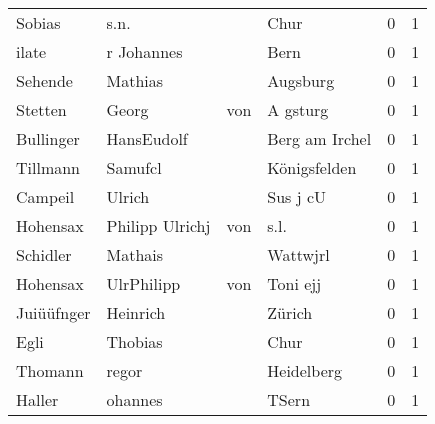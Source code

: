 \documentclass[10pt,a4paper,landscape]{article}
\begin{document}
\begin{longtable}{llllrr}
                   Sobias &                               s.n. &             &                                        Chur &          0 &         1 \\
                    ilate &                         r Johannes &             &                                        Bern &          0 &         1 \\
                  Sehende &                            Mathias &             &                                    Augsburg &          0 &         1 \\
                  Stetten &                              Georg &         von &                                    A gsturg &          0 &         1 \\
                Bullinger &                         HansEudolf &             &                              Berg am Irchel &          0 &         1 \\
                 Tillmann &                            Samufcl &             &                                Königsfelden &          0 &         1 \\
                  Campeil &                             Ulrich &             &                                    Sus j cU &          0 &         1 \\
                 Hohensax &                    Philipp Ulrichj &         von &                                        s.l. &          0 &         1 \\
                 Schidler &                            Mathais &             &                                    Wattwjrl &          0 &         1 \\
                 Hohensax &                         UlrPhilipp &         von &                                    Toni ejj &          0 &         1 \\
               Juiüüfnger &                           Heinrich &             &                                      Zürich &          0 &         1 \\
                     Egli &                            Thobias &             &                                        Chur &          0 &         1 \\
                  Thomann &                              regor &             &                                  Heidelberg &          0 &         1 \\
                   Haller &                            ohannes &             &                                       TSern &          0 &         1 \\

\end{longtable}
\end{document}
